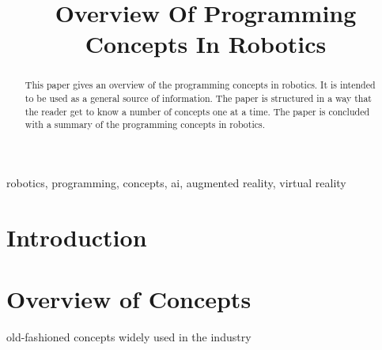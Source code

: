 \documentclass[conference]{IEEEtran}
\begin{document}
\title{Overview Of Programming Concepts In Robotics\\}

\author{

    \and
}

\maketitle

\begin{abstract}
    This paper gives an overview of the programming concepts in robotics. It is intended to be used as a general source of information. The paper is structured in a way that the reader get to know a number of concepts one at a time. The paper is concluded with a summary of the programming concepts in robotics.
\end{abstract}

\begin{IEEEkeywords}
    robotics, programming, concepts, ai, augmented reality, virtual reality 
\end{IEEEkeywords}

\section{Introduction}
  
\section{Overview of Concepts}

old-fashioned concepts
widely used in the industry
\end{document}
